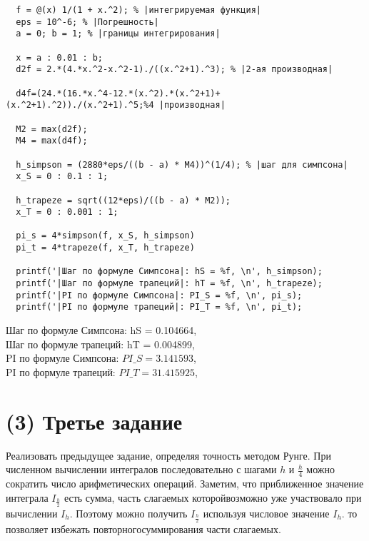 \begin{lstlisting}
  f = @(x) 1/(1 + x.^2); % |интегрируемая функция|
  eps = 10^-6; % |Погрешность|
  a = 0; b = 1; % |границы интегрирования|

  x = a : 0.01 : b;
  d2f = 2.*(4.*x.^2-x.^2-1)./((x.^2+1).^3); % |2-ая производная|

  d4f=(24.*(16.*x.^4-12.*(x.^2).*(x.^2+1)+(x.^2+1).^2))./(x.^2+1).^5;%4 |производная|

  M2 = max(d2f);
  M4 = max(d4f);

  h_simpson = (2880*eps/((b - a) * M4))^(1/4); % |шаг для симпсона|
  x_S = 0 : 0.1 : 1;

  h_trapeze = sqrt((12*eps)/((b - a) * M2));
  x_T = 0 : 0.001 : 1;

  pi_s = 4*simpson(f, x_S, h_simpson)
  pi_t = 4*trapeze(f, x_T, h_trapeze)

  printf('|Шаг по формуле Симпсона|: hS = %f, \n', h_simpson);
  printf('|Шаг по формуле трапеций|: hT = %f, \n', h_trapeze);
  printf('|PI по формуле Симпсона|: PI_S = %f, \n', pi_s);
  printf('|PI по формуле трапеций|: PI_T = %f, \n', pi_t);
\end{lstlisting}
Шаг по формуле Симпсона: hS = 0.104664,\\
Шаг по формуле трапеций: hT = 0.004899,\\
PI по формуле Симпсона: $PI\_S  = 3.141593$,\\
PI по формуле трапеций: $PI\_T  = 31.415925$,\\

\section{(3) Третье задание}
Реализовать предыдущее задание, определяя точность методом Рунге. При численном вычислении интегралов последовательно с шагами $h$ и $\frac{h}{4}$ можно сократить число арифметических операций. Заметим, что приближенное значение интеграла $I_{\frac{h}{2}}$ есть сумма, часть слагаемых которойвозможно уже участвовало при вычислении $I_{h}$. Поэтому можно получить $I_{\frac{h}{2}}$ используя числовое значение $I_{h}$. то позволяет избежать повторногосуммирования части слагаемых.

